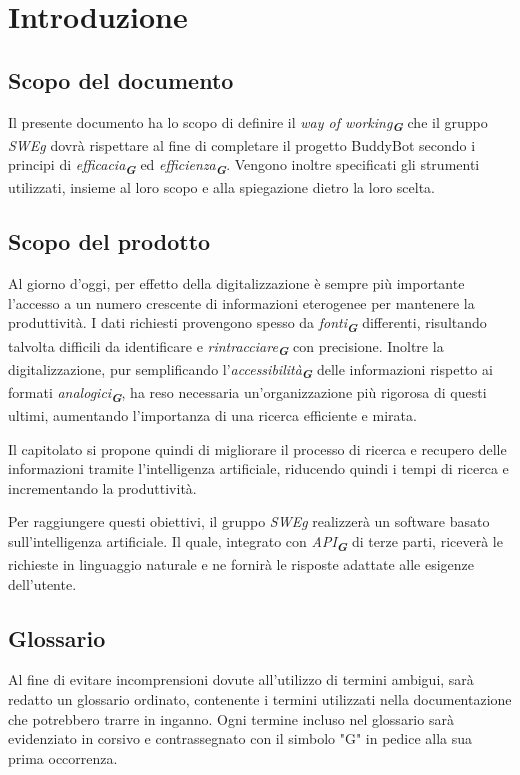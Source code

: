 


\section{Introduzione}
\label{sec:introduzione}

\subsection{Scopo del documento}
Il presente documento ha lo scopo di definire il \emph{way of working}\textsubscript{\textit{\textbf{G}}} che il gruppo \emph{SWEg} dovrà rispettare al fine di completare il progetto BuddyBot secondo i principi di \emph{efficacia}\textsubscript{\textit{\textbf{G}}} ed \emph{efficienza}\textsubscript{\textit{\textbf{G}}}.
Vengono inoltre specificati gli strumenti utilizzati, insieme al loro scopo e alla spiegazione dietro la loro scelta.
\subsection{Scopo del prodotto}
Al giorno d'oggi, per effetto della digitalizzazione è sempre più importante l'accesso a un numero crescente di informazioni eterogenee per mantenere la produttività. I dati richiesti provengono spesso da  \emph{fonti}\textsubscript{\textit{\textbf{G}}} differenti, risultando talvolta difficili da identificare e  \emph{rintracciare}\textsubscript{\textit{\textbf{G}}} con precisione. Inoltre la digitalizzazione, pur semplificando l'\emph{accessibilità}\textsubscript{\textit{\textbf{G}}} delle informazioni rispetto ai formati  \emph{analogici}\textsubscript{\textit{\textbf{G}}}, ha reso necessaria un'organizzazione più rigorosa di questi ultimi, aumentando l'importanza di una ricerca efficiente e mirata.

Il capitolato si propone quindi di migliorare il processo di ricerca e recupero delle informazioni tramite l'intelligenza artificiale, riducendo quindi i tempi di ricerca e incrementando la produttività.

Per raggiungere questi obiettivi, il gruppo \emph{SWEg} realizzerà un software basato sull'intelligenza artificiale. Il quale, integrato con \emph{API}\textsubscript{\textit{\textbf{G}}} di terze parti, riceverà le richieste in linguaggio naturale e ne fornirà le risposte adattate alle esigenze dell'utente.
\subsection{Glossario}
Al fine di evitare incomprensioni dovute all'utilizzo di termini ambigui, sarà redatto un glossario ordinato, contenente i termini utilizzati nella documentazione che potrebbero trarre in inganno. Ogni termine incluso nel glossario sarà evidenziato in corsivo e contrassegnato con il simbolo "G" in pedice alla sua prima occorrenza.

